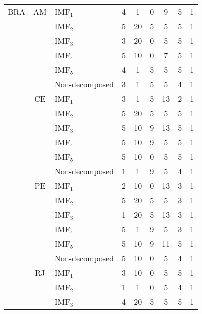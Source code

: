 {\begin{longtable}[htb!]{cclc|cc|c|c|c}
BRA & {AM} & IMF$_1$        & 4 & 1  & 0 & 9  & 5 & 1 \\
                      &                     & IMF$_2$        & 5 & 20 & 5 & 5  & 5 & 1 \\
                      &                     & IMF$_3$        & 3 & 20 & 0 & 5  & 5 & 1 \\
                      &                     & IMF$_4$        & 5 & 10 & 0 & 7  & 5 & 1 \\
                      &                     & IMF$_5$        & 4 & 1  & 5 & 5  & 5 & 1 \\
                      &                     & Non-decomposed & 3 & 1  & 5 & 5  & 4 & 1 \\ \cline{2-9}
                      & {CE} & IMF$_1$        & 3 & 1  & 5 & 13 & 2 & 1 \\
                      &                     & IMF$_2$        & 5 & 20 & 5 & 5  & 5 & 1 \\
                      &                     & IMF$_3$        & 5 & 10 & 9 & 13 & 5 & 1 \\
                      &                     & IMF$_4$        & 5 & 10 & 9 & 5  & 5 & 1 \\
                      &                     & IMF$_5$        & 5 & 10 & 0 & 5  & 5 & 1 \\
                      &                     & Non-decomposed & 1 & 1  & 9 & 5  & 4 & 1 \\ \cline{2-9}
                      & {PE} & IMF$_1$        & 2 & 10 & 0 & 13 & 3 & 1 \\
                      &                     & IMF$_2$        & 5 & 20 & 5 & 5  & 3 & 1 \\
                      &                     & IMF$_3$        & 1 & 20 & 5 & 13 & 3 & 1 \\
                      &                     & IMF$_4$        & 5 & 1  & 9 & 5  & 3 & 1 \\
                      &                     & IMF$_5$        & 5 & 10 & 9 & 11 & 5 & 1 \\
                      &                     & Non-decomposed & 5 & 10 & 0 & 5  & 4 & 1 \\ \cline{2-9}
                      & {RJ} & IMF$_1$        & 3 & 10 & 0 & 5  & 5 & 1 \\
                      &                     & IMF$_2$        & 1 & 1  & 0 & 5  & 4 & 1 \\
                      &                     & IMF$_3$        & 4 & 20 & 5 & 5  & 5 & 1 \\

\end{longtable}}
